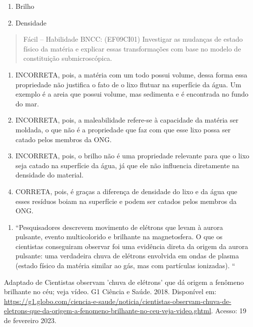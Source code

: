 \begin{enumerate}
\def\labelenumi{(\Alph{enumi})}
\setcounter{enumi}{2}
\item
  Brilho
\item
  Densidade
\end{enumerate}

\begin{quote}
Fácil -- Habilidade BNCC: (EF09CI01) Investigar as mudanças de estado
físico da matéria e explicar essas transformações com base no modelo de
constituição submicroscópica.
\end{quote}

\begin{enumerate}
\def\labelenumi{(\Alph{enumi})}
\item
  INCORRETA, pois, a matéria com um todo possui volume, dessa forma essa
  propriedade não justifica o fato de o lixo flutuar na superfície da
  água. Um exemplo é a areia que possui volume, mas sedimenta e é
  encontrada no fundo do mar.
\item
  INCORRETA, pois, a maleabilidade refere-se à capacidade da matéria ser
  moldada, o que não é a propriedade que faz com que esse lixo possa ser
  catado pelos membros da ONG.
\item
  INCORRETA, pois, o brilho não é uma propriedade relevante para que o
  lixo seja catado na superfície da água, já que ele não influencia
  diretamente na densidade do material.
\item
  CORRETA, pois, é graças a diferença de densidade do lixo e da água que
  esses resíduos boiam na superfície e podem ser catados pelos membros
  da ONG.
\end{enumerate}

\begin{enumerate}
\def\labelenumi{\arabic{enumi})}
\item
  ``Pesquisadores descrevem movimento de elétrons que levam à aurora
  pulsante, evento multicolorido e brilhante na magnetosfera. O que os
  cientistas conseguiram observar foi uma evidência direta da origem da
  aurora pulsante: uma verdadeira chuva de elétrons envolvida em ondas
  de plasma (estado físico da matéria similar ao gás, mas com partículas
  ionizadas). ``
\end{enumerate}

Adaptado de Cientistas observam 'chuva de elétrons' que dá origem a
fenômeno brilhante no céu; veja vídeo. G1 Ciência e Saúde. 2018.
Disponível em:
\url{https://g1.globo.com/ciencia-e-saude/noticia/cientistas-observam-chuva-de-eletrons-que-da-origem-a-fenomeno-brilhante-no-ceu-veja-video.ghtml}.
Acesso: 19 de fevereiro 2023.

